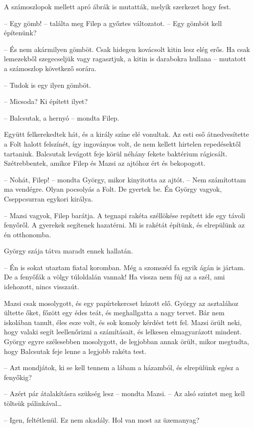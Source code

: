 \documentclass[10pt]{memoir}
\begin{document}
A számoszlopok mellett apró ábrák is mutatták, melyik szerkezet hogy fest.

-- Egy gömb! -- találta meg Filep a győztes változatot. -- Egy gömböt kell
építenünk?

-- És nem akármilyen gömböt. Csak hidegen kovácsolt kitin lesz elég erős. Ha
csak lemezekből szegecseljük vagy ragasztjuk, a kitin is darabokra hullana --
mutatott a számoszlop következő sorára.

-- Tudok is egy ilyen gömböt.

-- Micsoda? Ki épített ilyet?

-- Balcsutak, a hernyó -- mondta Filep.

Együtt felkerekedtek hát, és a király színe elé vonultak. Az esti eső
átnedvesítette a Folt halott felszínét, így ingoványos volt, de nem kellett
hirtelen repedésektől tartaniuk. Balcsutak levágott feje körül néhány fekete
baktérium rágicsált. Szétrebbentek, amikor Filep és Mazsi az ajtóhoz ért és
bekopogott.

-- Nohát, Filep! -- mondta György, mikor kinyitotta az ajtót. -- Nem
számítottam ma vendégre. Olyan pocsolyás a Folt. De gyertek be. Én György
vagyok, Cseppcsurran egykori királya.

-- Mazsi vagyok, Filep barátja. A tegnapi rakéta széllökése repített ide egy
távoli fenyőről. A gyerekek segítenek hazatérni. Mi is rakétát építünk, és
elrepülünk az én otthonomba.

György szája tátva maradt ennek hallatán.

-- Én is sokat utaztam fiatal koromban. Még a szomszéd fa egyik ágán is
jártam.  De a fenyőfák a völgy túloldalán vannak! Ha vissza nem fúj az a szél,
ami idehozott, nincs visszaút.

Mazsi csak mosolygott, és egy papírtekercset húzott elő. György az asztalához
ültette őket, főzött egy édes teát, és meghallgatta a nagy tervet. Bár nem
iskolában tanult, éles esze volt, és sok komoly kérdést tett fel. Mazsi örült
neki, hogy valaki segít leellenőrizni a számításait, és lelkesen elmagyarázott
mindent. György egyre szélesebben mosolygott, de legjobban annak örült, mikor
megtudta, hogy Balcsutak feje lenne a legjobb rakéta test.

-- Azt mondjátok, ki se kell tennem a lábam a házamból, és elrepülünk egész a
fenyőkig?

-- Azért pár átalakításra szükség lesz -- mondta Mazsi. -- Az alsó szintet
meg kell töltsük pálinkával\dots

-- Igen, feltétlenül. Ez nem akadály. Hol van most az üzemanyag?
\end{document}
